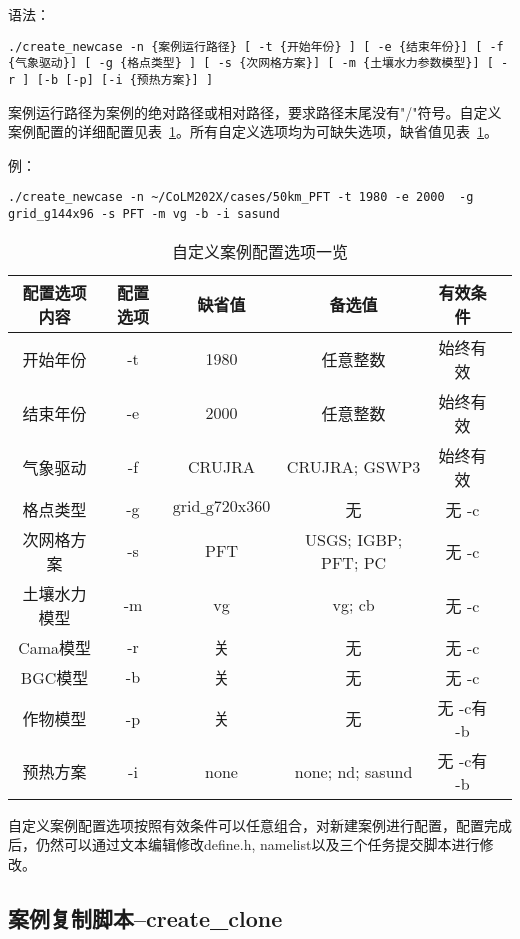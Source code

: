 \documentclass[a4paper,12pt,twoside]{article}
\begin{document}
语法：
\begin{lstlisting}
./create_newcase -n {案例运行路径} [ -t {开始年份} ] [ -e {结束年份}] [ -f {气象驱动}] [ -g {格点类型} ] [ -s {次网格方案}] [ -m {土壤水力参数模型}] [ -r ] [-b [-p] [-i {预热方案}] ]  
\end{lstlisting}

案例运行路径为案例的绝对路径或相对路径，要求路径末尾没有"/"符号。自定义案例配置的详细配置见表~\ref{tab:custom_option}。所有自定义选项均为可缺失选项，缺省值见表~\ref{tab:custom_option}。

例：
\begin{lstlisting}
./create_newcase -n ~/CoLM202X/cases/50km_PFT -t 1980 -e 2000  -g grid_g144x96 -s PFT -m vg -b -i sasund 
\end{lstlisting}

\begin{table}[!htbp]
\renewcommand{\arraystretch}{1.5}
\centering 
\caption{自定义案例配置选项一览}\label{tab:custom_option}
\begin{tabular}{
cccccc} \toprule
\textbf{配置选项内容} & \textbf{配置选项} & \textbf{缺省值} & \textbf{备选值} & \textbf{有效条件}\\ \midrule
开始年份 & -t & 1980 & 任意整数 & 始终有效\\
结束年份 & -e & 2000 & 任意整数 & 始终有效\\
气象驱动 & -f & CRUJRA & CRUJRA; GSWP3  & 始终有效\\
格点类型 & -g & $\mathrm{grid}\_\mathrm{g}720\mathrm{x}360$ & 无& 无 -c\\
次网格方案 & -s & PFT & USGS; IGBP; PFT; PC & 无 -c\\
土壤水力模型 & -m & vg & vg; cb& 无 -c\\
Cama模型 & -r & 关 & 无& 无 -c\\
BGC模型 & -b & 关 & 无& 无 -c\\
作物模型 & -p & 关 & 无& 无 -c有 -b\\
预热方案 & -i & none & none; nd; sasund& 无 -c有 -b\\
\bottomrule
\end{tabular}
\end{table}

自定义案例配置选项按照有效条件可以任意组合，对新建案例进行配置，配置完成后，仍然可以通过文本编辑修改define.h, namelist以及三个任务提交脚本进行修改。

\subsection{案例复制脚本--create\_clone}
\end{document}
